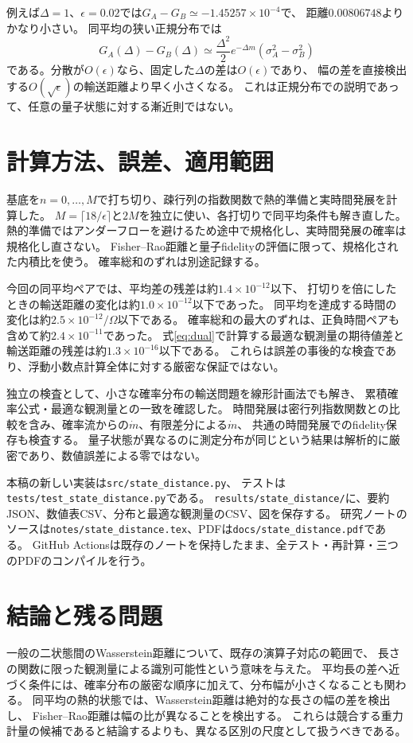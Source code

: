 \documentclass[a4paper,11pt]{ltjsarticle}
\numberwithin{equation}{section}
\begin{document}
例えば$\Delta=1$、$\epsilon=0.02$では$G_A-G_B\simeq-1.45257\times10^{-4}$で、
距離$0.00806748$よりかなり小さい。
同平均の狭い正規分布では
\begin{equation}
 G_A(\Delta)-G_B(\Delta)
 \simeq\frac{\Delta^2}{2}e^{-\Delta m}(\sigma_A^2-\sigma_B^2)
 \label{eq:probegaussian}
\end{equation}
である。分散が$O(\epsilon)$なら、固定した$\Delta$の差は$O(\epsilon)$であり、
幅の差を直接検出する$O(\sqrt\epsilon)$の輸送距離より早く小さくなる。
これは正規分布での説明であって、任意の量子状態に対する漸近則ではない。

\section{計算方法、誤差、適用範囲}
基底を$n=0,\ldots,M$で打ち切り、疎行列の指数関数で熱的準備と実時間発展を計算した。
$M=\lceil18/\epsilon\rceil$と$2M$を独立に使い、各打切りで同平均条件も解き直した。
熱的準備ではアンダーフローを避けるため途中で規格化し、実時間発展の確率は規格化し直さない。
Fisher--Rao距離と量子fidelityの評価に限って、規格化された内積比を使う。
確率総和のずれは別途記録する。

今回の同平均ペアでは、平均差の残差は約$1.4\times10^{-12}$以下、
打切りを倍にしたときの輸送距離の変化は約$1.0\times10^{-12}$以下であった。
同平均を達成する時間の変化は約$2.5\times10^{-12}/\Omega$以下である。
確率総和の最大のずれは、正負時間ペアも含めて約$2.4\times10^{-11}$であった。
式\eqref{eq:dual}で計算する最適な観測量の期待値差と輸送距離の残差は約$1.3\times10^{-16}$以下である。
これらは誤差の事後的な検査であり、浮動小数点計算全体に対する厳密な保証ではない。

独立の検査として、小さな確率分布の輸送問題を線形計画法でも解き、
累積確率公式・最適な観測量との一致を確認した。
時間発展は密行列指数関数との比較を含み、確率流からの$\dot m$、有限差分による$\dot m$、
共通の時間発展でのfidelity保存も検査する。
量子状態が異なるのに測定分布が同じという結果は解析的に厳密であり、数値誤差による零ではない。

本稿の新しい実装は\texttt{src/state\_distance.py}、
テストは\texttt{tests/test\_state\_distance.py}である。
\texttt{results/state\_distance/}に、要約JSON、数値表CSV、分布と最適な観測量のCSV、図を保存する。
研究ノートのソースは\texttt{notes/state\_distance.tex}、PDFは\texttt{docs/state\_distance.pdf}である。
GitHub Actionsは既存のノートを保持したまま、全テスト・再計算・三つのPDFのコンパイルを行う。

\section{結論と残る問題}
一般の二状態間のWasserstein距離について、既存の演算子対応の範囲で、
長さの関数に限った観測量による識別可能性という意味を与えた。
平均長の差へ近づく条件には、確率分布の厳密な順序に加えて、分布幅が小さくなることも関わる。
同平均の熱的状態では、Wasserstein距離は絶対的な長さの幅の差を検出し、
Fisher--Rao距離は幅の比が異なることを検出する。
これらは競合する重力計量の候補であると結論するよりも、異なる区別の尺度として扱うべきである。
\end{document}

